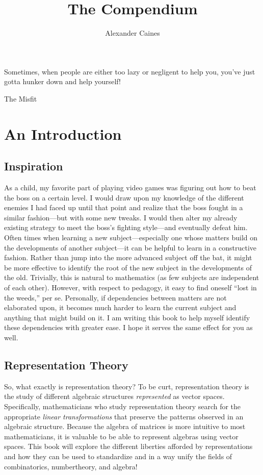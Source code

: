 \documentclass[11pt]{book}
\title{{\bf The Compendium}}
\author{Alexander Caines}
\begin{document}
\maketitle

\newpage
\epigraph{Sometimes, when people are either too lazy or negligent to help you, you've just
gotta hunker down and help yourself!}{The Misfit}
\newpage

\tableofcontents
\newpage

\section{An Introduction}
\subsection{Inspiration}
As a child, my favorite part of playing video games was figuring out how to beat the boss on a certain level. I would draw upon my 
knowledge of the different enemies I had faced up until that point and realize that the boss fought in a similar fashion---but with 
some new tweaks. I would then alter my already existing strategy to meet the boss's fighting style---and eventually defeat him.\\

Often times when learning a new subject---especially one whose matters build on the developments of another subject---it can be 
helpful to learn in a constructive fashion. Rather than jump into the more advanced subject off the bat, it might be more effective 
to identify the root of the new subject in the developments of the old. Trivially, this is natural to mathematics (as few subjects 
are independent of each other). However, with respect to pedagogy, it easy to find oneself ``lost in the weeds,'' per se. Personally, if 
dependencies between matters are not elaborated upon, it becomes much harder to learn the current subject and anything that might build on 
it. I am writing this book to help myself identify these dependencies with greater ease. I hope it serves the same effect for you as well.

\subsection{Representation Theory}
So, what exactly is representation theory? To be curt, representation theory is the study of different algebraic 
structures \emph{represented} as vector spaces. Specifically, mathematicians who study representation theory search for 
the appropriate \emph{linear transformations} that preserve the patterns observed in an algebraic structure. Because the 
algebra of matrices is more intuitive to most mathematicians, it is valuable to be able to represent algebras using vector spaces.
This book will explore the different liberties afforded by representations and how they can be used to standardize
and in a way unify the fields of combinatorics, numbertheory, and algebra!\\
\end{document}
